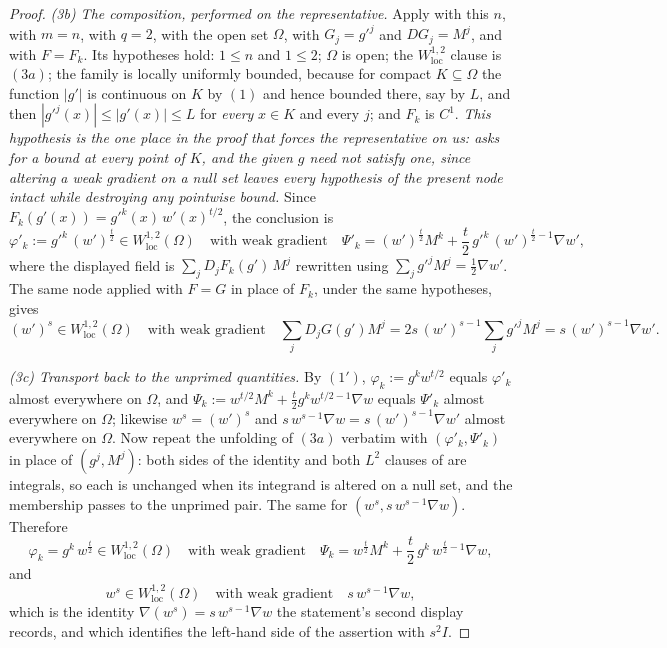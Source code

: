 \begin{proof}
\emph{(3b) The composition, performed on the representative.}  Apply
 with this $n$, with $m=n$, with $q=2$, with the
open set $\Omega$, with $G_j=g'^j$ and $DG_j=M^j$, and with $F=F_k$.  Its
hypotheses hold: $1\le n$ and $1\le2$; $\Omega$ is open; the
$W^{1,2}_{\mathrm{loc}}$ clause is $(3a)$; the family is locally uniformly
bounded, because for compact $K\subseteq\Omega$ the function $|g'|$ is
continuous on $K$ by $(1)$ and hence bounded there, say by $L$, and then
$|g'^j(x)|\le|g'(x)|\le L$ for \emph{every} $x\in K$ and every $j$; and $F_k$ is
$C^1$.  \emph{This hypothesis is the one place in the proof that forces the
representative on us:  asks for a bound at every
point of $K$, and the given $g$ need not satisfy one, since altering a weak
gradient on a null set leaves every hypothesis of the present node intact while
destroying any pointwise bound.}  Since $F_k(g'(x))=g'^k(x)\,w'(x)^{t/2}$, the
conclusion is
\[
\varphi'_k:=g'^k\,(w')^{\frac t2}\in W^{1,2}_{\mathrm{loc}}(\Omega)
\quad\text{with weak gradient}\quad
\Psi'_k=(w')^{\frac t2}M^k+\frac t2\,g'^k\,(w')^{\frac t2-1}\nabla w' ,
\]
where the displayed field is $\sum_jD_jF_k(g')\,M^j$ rewritten using
$\sum_jg'^jM^j=\tfrac12\nabla w'$.  The same node applied with $F=G$ in place of
$F_k$, under the same hypotheses, gives
\[
(w')^{s}\in W^{1,2}_{\mathrm{loc}}(\Omega)
\quad\text{with weak gradient}\quad
\sum_jD_jG(g')M^j=2s\,(w')^{s-1}\sum_jg'^jM^j=s\,(w')^{s-1}\nabla w' .
\]

\emph{(3c) Transport back to the unprimed quantities.}  By $(1')$,
$\varphi_k:=g^kw^{t/2}$ equals $\varphi'_k$ almost everywhere on $\Omega$, and
$\Psi_k:=w^{t/2}M^k+\tfrac t2g^kw^{t/2-1}\nabla w$ equals $\Psi'_k$ almost
everywhere on $\Omega$; likewise $w^s=(w')^s$ and
$s\,w^{s-1}\nabla w=s\,(w')^{s-1}\nabla w'$ almost everywhere on $\Omega$.  Now
repeat the unfolding of $(3a)$ verbatim with $(\varphi'_k,\Psi'_k)$ in place of
$(g^j,M^j)$: both sides of the  identity and both
$L^2$ clauses of  are integrals, so each is unchanged when
its integrand is altered on a null set, and the membership passes to the
unprimed pair.  The same for $(w^s,s\,w^{s-1}\nabla w)$.  Therefore
\[
\varphi_k=g^k\,w^{\frac t2}\in W^{1,2}_{\mathrm{loc}}(\Omega)
\quad\text{with weak gradient}\quad
\Psi_k=w^{\frac t2}M^k+\frac t2\,g^k\,w^{\frac t2-1}\nabla w ,
\tag{3}
\]
and
\[
w^{s}\in W^{1,2}_{\mathrm{loc}}(\Omega)
\quad\text{with weak gradient}\quad
s\,w^{s-1}\nabla w ,
\tag{4}
\]
which is the identity $\nabla(w^s)=s\,w^{s-1}\nabla w$ the statement's second
display records, and which identifies the left-hand side of the assertion with
$s^2I$.


\end{proof}

